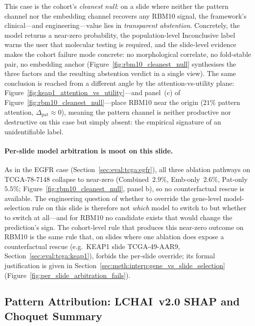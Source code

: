 This case is the cohort's \emph{cleanest null}: on a slide where
neither the pattern channel nor the embedding channel recovers any
RBM10 signal, the framework's clinical---and engineering---value
lies in \emph{transparent abstention}.
Concretely, the model returns a near-zero probability, the
population-level Inconclusive label warns the user that molecular
testing is required, and the slide-level evidence makes the
cohort failure mode concrete: no morphological correlate, no
fold-stable pair, no embedding anchor
(Figure~\ref{fig:rbm10_cleanest_null} synthesises the three
factors and the resulting abstention verdict in a single view).
The same conclusion is reached from a different angle by the
attention-vs-utility plane:
Figure~\ref{fig:keap1_attention_vs_utility}---and panel~(c) of
Figure~\ref{fig:rbm10_cleanest_null}---place RBM10 near the
origin ($21\%$ pattern attention,
$\Delta_{\text{pat}} \approx 0$), meaning the pattern channel
is neither productive nor destructive on this case but simply
absent: the empirical signature of an unidentifiable label.

\paragraph{Per-slide model arbitration is moot on this slide.}
As in the EGFR case (Section~\ref{sec:eval:tcga:egfr}), all
three ablation pathways on TCGA-78-7148 collapse to near-zero
(Combined~$2.9\%$, Emb-only~$2.6\%$, Pat-only~$5.5\%$;
Figure~\ref{fig:rbm10_cleanest_null}, panel b), so no
counterfactual rescue is available.
The engineering question of whether to override the gene-level
model-selection rule on this slide is therefore not \emph{which}
model to switch to but whether to switch at all---and for RBM10
no candidate exists that would change the prediction's sign.
The cohort-level rule that produces this near-zero outcome on
RBM10 is the same rule that, on slides where one ablation does
expose a counterfactual rescue (e.g.\ KEAP1 slide TCGA-49-AAR9,
Section~\ref{sec:eval:tcga:keap1}), forbids the per-slide
override; its formal justification is given in
Section~\ref{sec:meth:interp:gene_vs_slide_selection}
(Figure~\ref{fig:per_slide_arbitration_fails}).


\subsection{Pattern Attribution: LCHAI~v2.0 SHAP and Choquet Summary}
\label{sec:eval:interp:enrichment}

